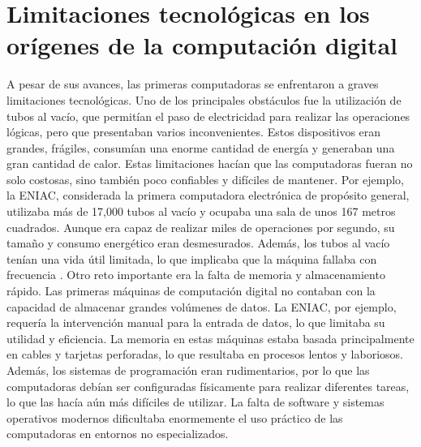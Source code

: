 \documentclass[]{article}
\begin{document}
\section{Limitaciones tecnológicas en los orígenes de la computación digital}
A pesar de sus avances, las primeras computadoras se enfrentaron a graves limitaciones tecnológicas. Uno de los principales obstáculos fue la utilización de tubos al vacío, que permitían el paso de electricidad para realizar las operaciones lógicas, pero que presentaban varios inconvenientes. Estos dispositivos eran grandes, frágiles, consumían una enorme cantidad de energía y generaban una gran cantidad de calor. Estas limitaciones hacían que las computadoras fueran no solo costosas, sino también poco confiables y difíciles de mantener.
Por ejemplo, la ENIAC, considerada la primera computadora electrónica de propósito general, utilizaba más de 17,000 tubos al vacío y ocupaba una sala de unos 167 metros cuadrados. Aunque era capaz de realizar miles de operaciones por segundo, su tamaño y consumo energético eran desmesurados. Además, los tubos al vacío tenían una vida útil limitada, lo que implicaba que la máquina fallaba con frecuencia \cite{ceruzzi2003}.
Otro reto importante era la falta de memoria y almacenamiento rápido. Las primeras máquinas de computación digital no contaban con la capacidad de almacenar grandes volúmenes de datos. La ENIAC, por ejemplo, requería la intervención manual para la entrada de datos, lo que limitaba su utilidad y eficiencia. La memoria en estas máquinas estaba basada principalmente en cables y tarjetas perforadas, lo que resultaba en procesos lentos y laboriosos.
Además, los sistemas de programación eran rudimentarios, por lo que las computadoras debían ser configuradas físicamente para realizar diferentes tareas, lo que las hacía aún más difíciles de utilizar. La falta de software y sistemas operativos modernos dificultaba enormemente el uso práctico de las computadoras en entornos no especializados.
\end{document}
